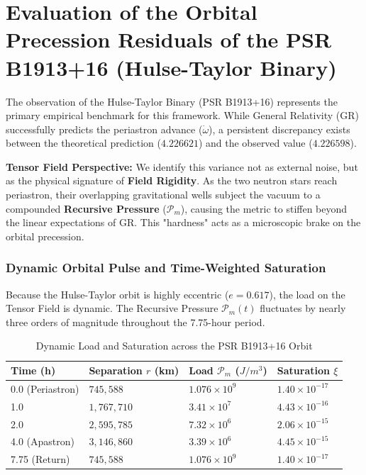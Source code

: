 \documentclass{article}
\begin{document}
\section{Evaluation of the Orbital Precession Residuals of the PSR B1913+16 (Hulse-Taylor Binary)}

The observation of the Hulse-Taylor Binary (PSR B1913+16) \cite{HulseTaylor1975} represents the primary empirical benchmark for this framework. While General Relativity (GR) successfully predicts the periastron advance ($\dot{\omega}$), a persistent discrepancy exists between the theoretical prediction ($4.226621$) and the observed value ($4.226598$). 

\textbf{Tensor Field Perspective:} We identify this variance not as external noise, but as the physical signature of \textbf{Field Rigidity}. As the two neutron stars reach periastron, their overlapping gravitational wells subject the vacuum to a compounded \textbf{Recursive Pressure} ($\mathcal{P}_m$), causing the metric to stiffen beyond the linear expectations of GR. This "hardness" acts as a microscopic brake on the orbital precession.

\subsubsection{Dynamic Orbital Pulse and Time-Weighted Saturation}
Because the Hulse-Taylor orbit is highly eccentric ($e = 0.617$), the load on the Tensor Field is dynamic. The Recursive Pressure $\mathcal{P}_m(t)$ fluctuates by nearly three orders of magnitude throughout the 7.75-hour period.



\begin{table}[h!]
\centering
\renewcommand{\arraystretch}{1.5}
\begin{tabular}{|l|l|l|l|}
\hline
\textbf{Time (h)} & \textbf{Separation $r$ (km)} & \textbf{Load $\mathcal{P}_m$ ($J/m^3$)} & \textbf{Saturation $\xi$} \\ \hline
0.0 (Periastron) & $745,588$ & $1.076 \times 10^9$ & $1.40 \times 10^{-17}$ \\ \hline
1.0 & $1,767,710$ & $3.41 \times 10^7$ & $4.43 \times 10^{-16}$ \\ \hline
2.0 & $2,595,785$ & $7.32 \times 10^6$ & $2.06 \times 10^{-15}$ \\ \hline
4.0 (Apastron) & $3,146,860$ & $3.39 \times 10^6$ & $4.45 \times 10^{-15}$ \\ \hline
7.75 (Return) & $745,588$ & $1.076 \times 10^9$ & $1.40 \times 10^{-17}$ \\ \hline
\end{tabular}
\caption{Dynamic Load and Saturation across the PSR B1913+16 Orbit}
\label{tab:orbital_pulse}
\end{table}
\end{document}
